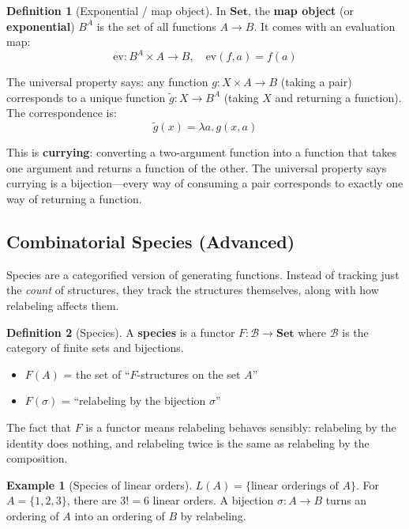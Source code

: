 \documentclass[11pt]{article}
\newcommand{\cat}[1]{\mathbf{#1}}
\newcommand{\Set}{\cat{Set}}
\theoremstyle{definition}
\newtheorem{definition}{Definition}[section]
\newtheorem{example}{Example}[section]
\theoremstyle{plain}
\theoremstyle{remark}
\begin{document}
\begin{definition}[Exponential / map object]
In $\Set$, the \textbf{map object} (or \textbf{exponential}) $B^A$ is the set of all functions $A \to B$. It comes with an evaluation map:
\[
\mathrm{ev}: B^A \times A \to B, \quad \mathrm{ev}(f, a) = f(a)
\]
\end{definition}

The universal property says: any function $g: X \times A \to B$ (taking a pair) corresponds to a unique function $\tilde{g}: X \to B^A$ (taking $X$ and returning a function). The correspondence is:
\[
\tilde{g}(x) = \lambda a.\, g(x, a)
\]

This is \textbf{currying}: converting a two-argument function into a function that takes one argument and returns a function of the other. The universal property says currying is a bijection---every way of consuming a pair corresponds to exactly one way of returning a function.

\subsection{Combinatorial Species (Advanced)}

Species are a categorified version of generating functions. Instead of tracking just the \emph{count} of structures, they track the structures themselves, along with how relabeling affects them.

\begin{definition}[Species]
A \textbf{species} is a functor $F: \mathcal{B} \to \Set$ where $\mathcal{B}$ is the category of finite sets and bijections.
\begin{itemize}
  \item $F(A)$ = the set of ``$F$-structures on the set $A$''
  \item $F(\sigma)$ = ``relabeling by the bijection $\sigma$''
\end{itemize}
\end{definition}

The fact that $F$ is a functor means relabeling behaves sensibly: relabeling by the identity does nothing, and relabeling twice is the same as relabeling by the composition.

\begin{example}[Species of linear orders]
$L(A) = \{\text{linear orderings of } A\}$. For $A = \{1,2,3\}$, there are $3! = 6$ linear orders. A bijection $\sigma: A \to B$ turns an ordering of $A$ into an ordering of $B$ by relabeling.
\end{example}
\end{document}
